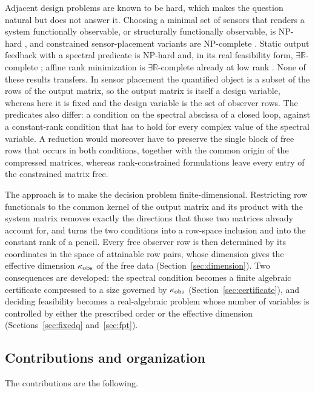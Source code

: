 Adjacent design problems are known to be hard, which makes the question natural but does
not answer it. Choosing a minimal set of sensors that renders a system functionally
observable, or structurally functionally observable, is NP-hard \cite{zha25}, and
constrained sensor-placement variants are NP-complete \cite{dey21}. Static output
feedback with a spectral predicate is NP-hard \cite{lof26,bar26} and, in its real
feasibility form, $\exists\mathbb R$-complete \cite{liu26}; affine rank minimization is
$\exists\mathbb R$-complete already at low rank \cite{maj26}. None of these results
transfers. In sensor placement the quantified object is a subset of the rows of the
output matrix, so the output matrix is itself a design variable, whereas here it is fixed
and the design variable is the set of observer rows. The predicates also differ: a
condition on the spectral abscissa of a closed loop, against a constant-rank condition
that has to hold for every complex value of the spectral variable. A reduction would
moreover have to preserve the single block of free rows that occurs in both conditions,
together with the common origin of the compressed matrices, whereas rank-constrained
formulations leave every entry of the constrained matrix free.

The approach is to make the decision problem finite-dimensional. Restricting row
functionals to the common kernel of the output matrix and its product with the system
matrix removes exactly the directions that those two matrices already account for, and
turns the two conditions into a row-space inclusion and into the constant rank of a
pencil. Every free observer row is then determined by its coordinates in the space of
attainable row pairs, whose dimension gives the effective dimension $\kappa_{\rm obs}$ of
the free data (Section~\ref{sec:dimension}). Two consequences are developed: the spectral
condition becomes a finite algebraic certificate compressed to a size governed by
$\kappa_{\rm obs}$ (Section~\ref{sec:certificate}), and deciding feasibility becomes a
real-algebraic problem whose number of variables is controlled by either the prescribed
order or the effective dimension (Sections~\ref{sec:fixedq} and~\ref{sec:fpt}).

\subsection{Contributions and organization}\label{sec:contrib}

The contributions are the following.


